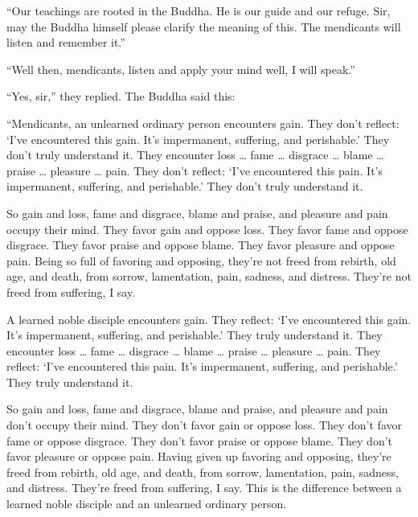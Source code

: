 \documentclass[12pt,openany]{book}%
\begin{document}
“Our teachings are rooted in the Buddha. He is our guide and our refuge. Sir, may the Buddha himself please clarify the meaning of this. The mendicants will listen and remember it.” 

“Well then, mendicants, listen and apply your mind well, I will speak.” 

“Yes, sir,” they replied. The Buddha said this: 

“Mendicants, an unlearned ordinary person encounters gain. They don’t reflect: ‘I’ve encountered this gain. It’s impermanent, suffering, and perishable.’ They don’t truly understand it. They encounter loss … fame … disgrace … blame … praise … pleasure … pain. They don’t reflect: ‘I’ve encountered this pain. It’s impermanent, suffering, and perishable.’ They don’t truly understand it. 

So gain and loss, fame and disgrace, blame and praise, and pleasure and pain occupy their mind. They favor gain and oppose loss. They favor fame and oppose disgrace. They favor praise and oppose blame. They favor pleasure and oppose pain. Being so full of favoring and opposing, they’re not freed from rebirth, old age, and death, from sorrow, lamentation, pain, sadness, and distress. They’re not freed from suffering, I say. 

A learned noble disciple encounters gain. They reflect: ‘I’ve encountered this gain. It’s impermanent, suffering, and perishable.’ They truly understand it. They encounter loss … fame … disgrace … blame … praise … pleasure … pain. They reflect: ‘I’ve encountered this pain. It’s impermanent, suffering, and perishable.’ They truly understand it. 

So gain and loss, fame and disgrace, blame and praise, and pleasure and pain don’t occupy their mind. They don’t favor gain or oppose loss. They don’t favor fame or oppose disgrace. They don’t favor praise or oppose blame. They don’t favor pleasure or oppose pain. Having given up favoring and opposing, they’re freed from rebirth, old age, and death, from sorrow, lamentation, pain, sadness, and distress. They’re freed from suffering, I say. This is the difference between a learned noble disciple and an unlearned ordinary person. 
\end{document}
